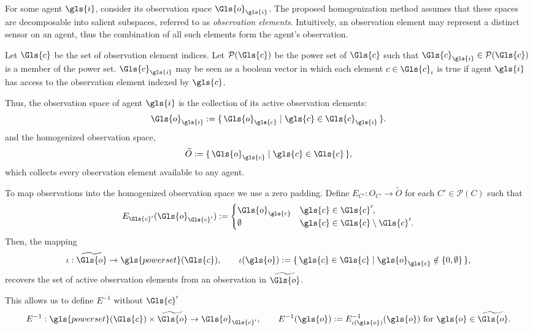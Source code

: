 \documentclass[]{jair}
\newcommand{\Hom}[1]{\widetilde{#1}}
\begin{document}
For some agent \(\gls{i}\), consider its observation space \(\Gls{o}_{\gls{i}}\).
The proposed homogenization method assumes that these spaces are 
decomposable into salient subspaces, referred to as \emph{observation elements}.
Intuitively, an observation element may represent a distinct sensor on an agent,
thus the combination of all such elements form the agent's observation.

Let \(\Gls{c}\) be the set of observation element indices.
Let \(\mathcal{P}(\Gls{c})\) be the power set of \(\Gls{c}\)
such that \(\Gls{c}_{\gls{i}} \in \mathcal{P}(\Gls{c})\) is a member of the power set.
\(\Gls{c}_{\gls{i}}\) may be seen as a boolean vector in which each element \(c\in \Gls{c}_i\)
is true if agent \(\gls{i}\) has access to the observation element indexed by \(\gls{c}\).

Thus, the observation space of agent \(\gls{i}\) is the collection of its active
observation elements:
\[
    \Gls{o}_{\gls{i}} := \{\, \Gls{o}_{\gls{c}} \mid \gls{c} \in \Gls{c}_{\gls{i}} \,\}.
\]
and the homogenized observation space,
\[
    \Hom{O}:= \{\, \Gls{o}_{\gls{c}} \mid \gls{c} \in \Gls{c} \,\},
\]
which collects every observation element available to any agent.

To map observations into the homogenized observation space we use a zero padding. 
Define \(E_{C'} : O_{C'} \to \Hom{O}\) for each \(C' \in \mathcal{P}(C)\) such that
\[
    E_{\Gls{c}'}(\Gls{o}_{\Gls{c}'}) := 
    \begin{cases}
        \Gls{o}_{\gls{c}} & \gls{c} \in \Gls{c}', \\
        \emptyset & \gls{c} \in \Gls{c}\setminus \Gls{c}'.
    \end{cases}
\]
Then, the mapping
\[
    \iota : \Hom{\Gls{o}} \to \gls{powerset}(\Gls{c}), \qquad
    \iota(\gls{o}) := \{\, \gls{c} \in \Gls{c} \mid \gls{o}_{\gls{c}} \notin \{0,\emptyset\} \,\},
\]
recovers the set of active observation elements from an observation in \(\Hom{\Gls{o}}\).

This allows us to define \(E^{-1}\) without \(\Gls{c}'\)
\[
    E^{-1} : \gls{powerset}(\Gls{c}) \times \Hom{\Gls{o}} \rightarrow \Gls{o}_{\Gls{c}'}, \qquad
    E^{-1}(\gls{o}) := E^{-1}_{\iota(\gls{o})}(\gls{o}) \text{ for } \gls{o} \in \Hom{\Gls{o}}.
\]
\end{document}
